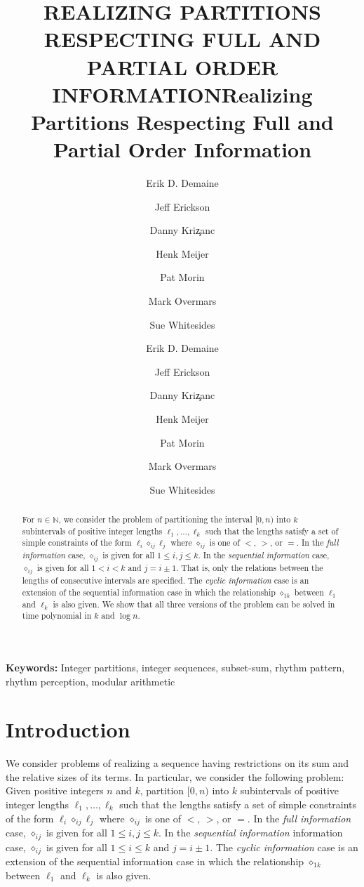\documentclass{elsart}
\title{\MakeUppercase{Realizing Partitions Respecting Full 
	and Partial Order Information}}
\author{
	Erik D. Demaine \and
	Jeff Erickson \and
	Danny Kri\c{z}anc \and
	Henk Meijer \and
	Pat Morin \and
	Mark Overmars \and
	Sue Whitesides
}
\date{}
\newcommand{\N}{\mathbb{N}}
\newcommand{\op}{\diamond}
\newcommand{\opij}{\op_{ij}}
\begin{document}
\begin{frontmatter}
\title{Realizing Partitions Respecting Full 
	and Partial Order Information}
\author{Erik D. Demaine}
\address{Massachusetts Institute of Technology}
\author{Jeff Erickson}
\address{University of Illinois at Urbana-Champaign}
\author{Danny Kri\c{z}anc}
\address{Wesleyan University}
\author{Henk Meijer}
\address{Queen's University}
\author{Pat Morin}
\address{Carleton University}
\author{Mark Overmars}
\address{University of Utrecht}
\author{Sue Whitesides}
\address{McGill University}

\begin{abstract} 
For $n\in\N$, we consider the problem of partitioning the interval
$[0,n)$ into $k$ subintervals of positive integer lengths
$\ell_1,\ldots,\ell_k$ such that the lengths satisfy a set of simple
constraints of the form $\ell_i \opij \ell_j$ where $\opij$ is one of
$<$, $>$, or $=$.  In the \emph{full information} case, $\opij$ is
given for all $1\le i,j\le k$.  In the \emph{sequential information}
case, $\opij$ is given for all $1< i< k$ and $j=i\pm 1$.
That is, only the relations between the lengths of consecutive
intervals are specified.  The \emph{cyclic information} case is an
extension of the sequential information case in which the 
relationship $\op_{1k}$ between $\ell_1$ and $\ell_k$ is also given.
We show that all three versions of the problem can be solved in time
polynomial in $k$ and $\log n$.
\end{abstract}
\end{frontmatter}

\noindent\textbf{Keywords:} Integer partitions, integer sequences,
subset-sum, rhythm pattern, rhythm perception, modular arithmetic

\section{Introduction}
We consider problems of realizing a sequence having restrictions on
its sum and the relative sizes of its terms.  In particular, we
consider the following problem:  Given positive integers $n$ and $k$,
partition $[0,n)$ into $k$ subintervals of positive integer lengths
$\ell_1,\ldots,\ell_k$ such that the lengths satisfy a set of simple
constraints of the form $\ell_i \opij \ell_j$ where $\opij$ is one of
$<$, $>$, or $=$.  In the \emph{full information} case, $\opij$ is
given for all $1\le i,j\le k$.  In the \emph{sequential information}
information case, $\opij$ is given for all $1\le i\le k$ and $j=i\pm
1$.  The \emph{cyclic information} case is an extension of the
sequential information case in which the relationship $\op_{1k}$
between $\ell_1$ and $\ell_k$ is also given. 
\end{document}
